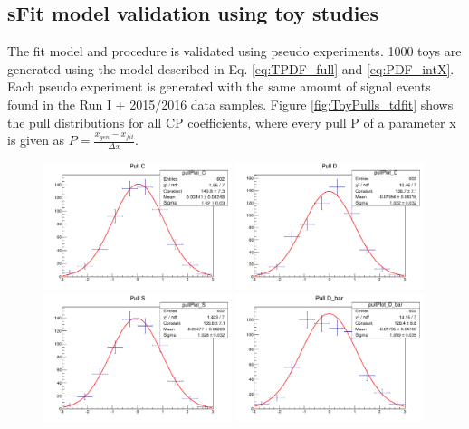 \subsection{\textsf{sFit} model validation using toy studies}
The fit model and procedure is validated using pseudo experiments. 1000 toys are generated using the model described in Eq. \ref{eq:TPDF_full} and \ref{eq:PDF_intX}. 
Each pseudo experiment is generated with the same amount of signal events found in the Run I + 2015/2016 data samples.  
Figure \ref{fig:ToyPulls_tdfit} shows the pull distributions for all CP coefficients, where every pull P of a parameter x is given as $P = \frac{x_{gen} - x_{fit}}{\Delta x}$.


\begin{figure}[h]
\includegraphics[height=!,width=0.49\textwidth]{figs/plots_toy/studies_timeFit/pull_C_all_Gaussfit.pdf}
\includegraphics[height=!,width=0.49\textwidth]{figs/plots_toy/studies_timeFit/pull_D_all_Gaussfit.pdf}
\includegraphics[height=!,width=0.49\textwidth]{figs/plots_toy/studies_timeFit/pull_S_all_Gaussfit.pdf}
\includegraphics[height=!,width=0.49\textwidth]{figs/plots_toy/studies_timeFit/pull_D_bar_all_Gaussfit.pdf}

\end{figure}
